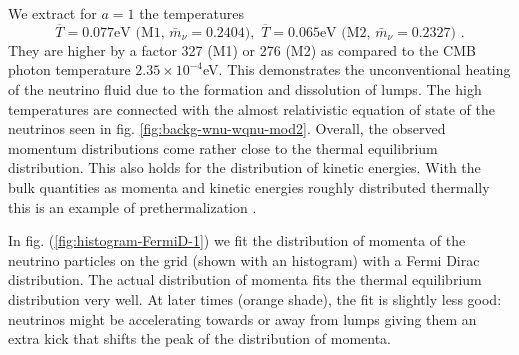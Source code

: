 We extract for $a=1$ the temperatures 
\begin{equation}
\overline{T}=0.077\mbox{eV}\,\,\mbox{(M1, }\bar{m}_{\nu}=0.2404\mbox{)},\,\,\overline{T}=0.065\mbox{eV}\,\,\mbox{(M2, }\bar{m}_{\nu}=0.2327\mbox{)}\,\,.
\end{equation}
They are higher by a factor 327 (M1) or 276 (M2) as compared to the
CMB photon temperature $2.35\times10^{-4}$eV. This demonstrates the
unconventional heating of the neutrino fluid due to the formation
and dissolution of lumps. The high temperatures are connected with
the almost relativistic equation of state of the neutrinos seen in
fig. \ref{fig:backg-wnu-wqnu-mod2}. Overall, the observed momentum
distributions come rather close to the thermal equilibrium distribution.
This also holds for the distribution of kinetic energies. With the
bulk quantities as momenta and kinetic energies roughly distributed
thermally this is an example of prethermalization \cite{berges_prethermalization_2004}.

In fig. (\ref{fig:histogram-FermiD-1}) we fit the distribution of
momenta of the neutrino particles on the grid (shown with an histogram)
with a Fermi Dirac distribution. The actual distribution of momenta
fits the thermal equilibrium distribution very well. At later times
(orange shade), the fit is slightly less good: neutrinos might be
accelerating towards or away from lumps giving them an extra kick
that shifts the peak of the distribution of momenta.

